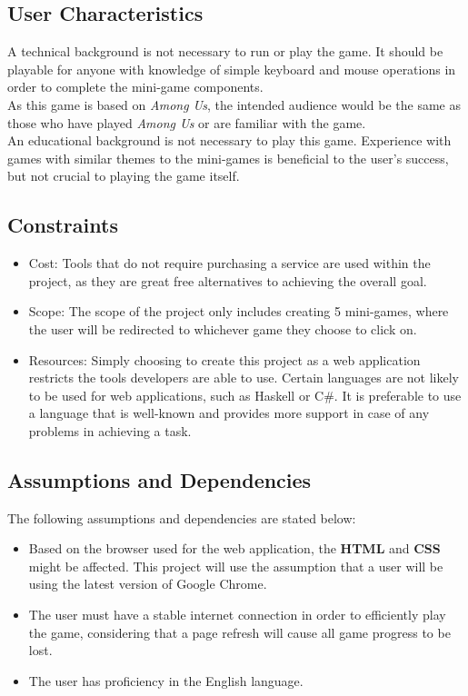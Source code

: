\documentclass[]{article}
\begin{document}

\subsection{User Characteristics}
\label{sub:user_characteristics}
A technical background is not necessary to run or play the game. It should be playable for anyone with knowledge of simple keyboard and mouse operations in order to complete the mini-game components.
\\


As this game is based on \textit{Among Us}, the intended audience would be the same as those who have played \textit{Among Us} or are familiar with the game.
\\


An educational background is not necessary to play this game. Experience with games with similar themes to the mini-games is beneficial to the user's success, but not crucial to playing the game itself.
    
\subsection{Constraints}
\label{sub:constraints}
\begin{itemize}
	\item Cost: Tools that do not require purchasing a service are used within the project, as they are great free alternatives to achieving the overall goal.
	\item Scope: The scope of the project only includes creating 5 mini-games, where the user will be redirected to whichever game they choose to click on.
	\item Resources: Simply choosing to create this project as a web application restricts the tools developers are able to use. Certain languages are not likely to be used for web applications, such as Haskell or C\#. It is preferable to use a language that is well-known and provides more support in case of any problems in achieving a task.
\end{itemize}

\subsection{Assumptions and Dependencies}
\label{sub:assumptions_and_dependencies}
The following assumptions and dependencies are stated below:
\begin{itemize}
	\item Based on the browser used for the web application, the  \textbf{HTML} and  \textbf{CSS} might be affected. This project will use the assumption that a user will be using the latest version of Google Chrome.
	\item The user must have a stable internet connection in order to efficiently play the game, considering that a page refresh will cause all game progress to be lost.
	\item The user has proficiency in the English language.
\end{itemize}
\end{document}
